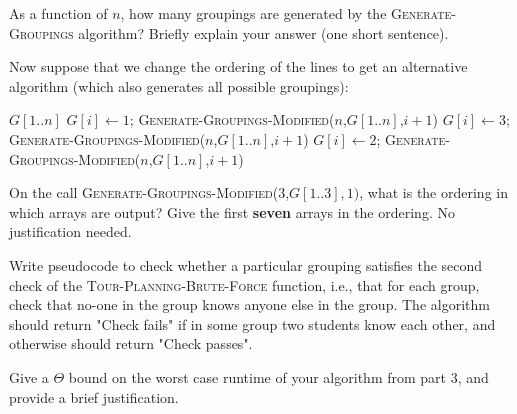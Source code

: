 \documentclass[11pt,fleqn]{exam}
\newif\ifsolutions\solutionsfalse
\begin{document}
\begin{questions}
\question[2]
As a function of $n$, how many groupings are generated by the \textsc{Generate-Groupings} algorithm? Briefly explain your answer (one short sentence).

\ifsolutions

\fi

\question[3]
Now suppose that we change the ordering of the lines to get an alternative algorithm (which also generates all possible groupings):

\begin{algorithmic}
    \Return $G[1..n]$
\Else
   \State $G[i] \gets 1$; \textsc{Generate-Groupings-Modified}($n$,$G[1..n]$,$i+1$)
   \State $G[i] \gets 3$; \textsc{Generate-Groupings-Modified}($n$,$G[1..n]$,$i+1$)
   \State $G[i] \gets 2$; \textsc{Generate-Groupings-Modified}($n$,$G[1..n]$,$i+1$)
\EndIf
   \EndFunction
\end{algorithmic}
On the call \textsc{Generate-Groupings-Modified}(3,$G[1..3],1)$,
what is the ordering in which arrays are output?
Give the first {\bf seven} arrays in the ordering. No justification needed.

\ifsolutions

\fi

\question[4]
Write pseudocode to check whether a particular grouping satisfies the second check of the \textsc{Tour-Planning-Brute-Force} function, i.e., that for each group, check that no-one in the group knows anyone else in the group. The algorithm should return "Check fails" if in some group two students know each other, and otherwise should return "Check passes".

\ifsolutions

\else
\begin{algorithmic}
\State
\State
\EndFunction
\end{algorithmic}
\fi
\question[2]
Give a $\Theta$ bound on the worst case runtime of your algorithm from part 3, and provide a brief justification. 

   \ifsolutions
    
\fi
\end{questions}
\end{document}

